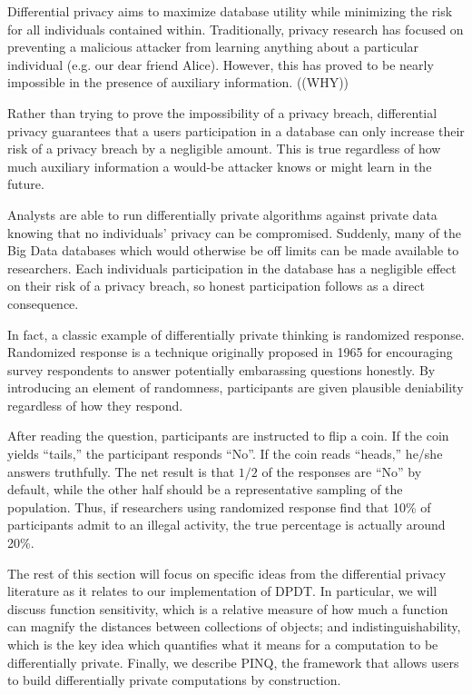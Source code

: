 \documentclass[12pt]{article}
\begin{document}
Differential privacy aims to maximize database utility while minimizing the risk for all individuals contained within.
Traditionally, privacy research has focused on preventing a malicious attacker from learning anything about a particular individual (e.g. our dear friend Alice).
However, this has proved to be nearly impossible in the presence of auxiliary information. ((WHY))

Rather than trying to prove the impossibility of a privacy breach, differential privacy guarantees that a users participation in a database can only increase their risk of a privacy breach by a negligible amount.
This is true regardless of how much auxiliary information a would-be attacker knows or might learn in the future.

Analysts are able to run differentially private algorithms against private data knowing that no individuals' privacy can be compromised.
Suddenly, many of the Big Data databases which would otherwise be off limits can be made available to researchers.
Each individuals participation in the database has a negligible effect on their risk of a privacy breach, so honest participation follows as a direct consequence.

In fact, a classic example of differentially private thinking is randomized response.
Randomized response is a technique originally proposed in 1965 for encouraging survey respondents to answer potentially embarassing questions honestly.
By introducing an element of randomness, participants are given plausible deniability regardless of how they respond.

After reading the question, participants are instructed to flip a coin.
If the coin yields ``tails,'' the participant responds ``No''.
If the coin reads ``heads,'' he/she answers truthfully.
The net result is that $1/2$ of the responses are ``No'' by default, while the other half should be a representative sampling of the population.
Thus, if researchers using randomized response find that 10\% of participants admit to an illegal activity, the true percentage is actually around 20\%.


The rest of this section will focus on specific ideas from the differential privacy literature as it relates to our implementation of DPDT.
In particular, we will discuss function sensitivity, which is a relative measure of how much a function can magnify the distances between collections of objects; and indistinguishability, which is the key idea which quantifies what it means for a computation to be differentially private.
Finally, we describe PINQ, the framework that allows users to build differentially private computations by construction.
\end{document}
